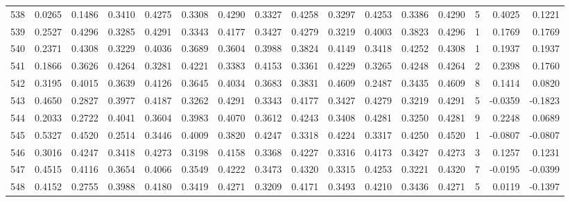 \begin{tabular}{lrrrrrrrrrrrrrrr}
538 &      0.0265 &  0.1486 &  0.3410 &  0.4275 &  0.3308 &  0.4290 &  0.3327 &  0.4258 &  0.3297 &  0.4253 &   0.3386 &     0.4290 &      5 &                    0.4025 &                     0.1221 \\
539 &      0.2527 &  0.4296 &  0.3285 &  0.4291 &  0.3343 &  0.4177 &  0.3427 &  0.4279 &  0.3219 &  0.4003 &   0.3823 &     0.4296 &      1 &                    0.1769 &                     0.1769 \\
540 &      0.2371 &  0.4308 &  0.3229 &  0.4036 &  0.3689 &  0.3604 &  0.3988 &  0.3824 &  0.4149 &  0.3418 &   0.4252 &     0.4308 &      1 &                    0.1937 &                     0.1937 \\
541 &      0.1866 &  0.3626 &  0.4264 &  0.3281 &  0.4221 &  0.3383 &  0.4153 &  0.3361 &  0.4229 &  0.3265 &   0.4248 &     0.4264 &      2 &                    0.2398 &                     0.1760 \\
542 &      0.3195 &  0.4015 &  0.3639 &  0.4126 &  0.3645 &  0.4034 &  0.3683 &  0.3831 &  0.4609 &  0.2487 &   0.3435 &     0.4609 &      8 &                    0.1414 &                     0.0820 \\
543 &      0.4650 &  0.2827 &  0.3977 &  0.4187 &  0.3262 &  0.4291 &  0.3343 &  0.4177 &  0.3427 &  0.4279 &   0.3219 &     0.4291 &      5 &                   -0.0359 &                    -0.1823 \\
544 &      0.2033 &  0.2722 &  0.4041 &  0.3604 &  0.3983 &  0.4070 &  0.3612 &  0.4243 &  0.3408 &  0.4281 &   0.3250 &     0.4281 &      9 &                    0.2248 &                     0.0689 \\
545 &      0.5327 &  0.4520 &  0.2514 &  0.3446 &  0.4009 &  0.3820 &  0.4247 &  0.3318 &  0.4224 &  0.3317 &   0.4250 &     0.4520 &      1 &                   -0.0807 &                    -0.0807 \\
546 &      0.3016 &  0.4247 &  0.3418 &  0.4273 &  0.3198 &  0.4158 &  0.3368 &  0.4227 &  0.3316 &  0.4173 &   0.3427 &     0.4273 &      3 &                    0.1257 &                     0.1231 \\
547 &      0.4515 &  0.4116 &  0.3654 &  0.4066 &  0.3549 &  0.4222 &  0.3473 &  0.4320 &  0.3315 &  0.4253 &   0.3221 &     0.4320 &      7 &                   -0.0195 &                    -0.0399 \\
548 &      0.4152 &  0.2755 &  0.3988 &  0.4180 &  0.3419 &  0.4271 &  0.3209 &  0.4171 &  0.3493 &  0.4210 &   0.3436 &     0.4271 &      5 &                    0.0119 &                    -0.1397 \\

\end{tabular}
